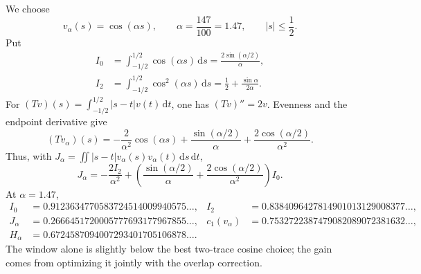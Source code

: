 \documentclass[11pt]{article}
\newcommand{\dd}{\,\mathrm{d}}
\begin{document}
We choose
\begin{equation}
 v_\alpha(s)=\cos(\alpha s),\qquad
 \alpha=\frac{147}{100}=1.47,\qquad |s|\le\frac12.
 \label{eq:window}
\end{equation}
Put
\begin{align}
 I_0&=\int_{-1/2}^{1/2}\cos(\alpha s)\dd s
      =\frac{2\sin(\alpha/2)}{\alpha},\\
 I_2&=\int_{-1/2}^{1/2}\cos^2(\alpha s)\dd s
      =\frac12+\frac{\sin\alpha}{2\alpha}.
 \label{eq:i0i2}
\end{align}
For $(Tv)(s)=\int_{-1/2}^{1/2}|s-t|v(t)\dd t$, one has $(Tv)''=2v$.
Evenness and the endpoint derivative give
\begin{equation}
 (Tv_\alpha)(s)=-\frac{2}{\alpha^2}\cos(\alpha s)
 +\frac{\sin(\alpha/2)}{\alpha}
 +\frac{2\cos(\alpha/2)}{\alpha^2}.
 \label{eq:tv}
\end{equation}
Thus, with $J_\alpha=\iint|s-t|v_\alpha(s)v_\alpha(t)\dd s\dd t$,
\begin{equation}
 J_\alpha=-\frac{2I_2}{\alpha^2}
 +\left(\frac{\sin(\alpha/2)}{\alpha}
 +\frac{2\cos(\alpha/2)}{\alpha^2}\right)I_0.
 \label{eq:jalpha}
\end{equation}
At $\alpha=1.47$,
\begin{align*}
 I_0&=0.9123634770583724514009940575\ldots,&
 I_2&=0.8384096427814901013129008377\ldots,\\
 J_\alpha&=0.2666451720005777693177967855\ldots,&
 c_1(v_\alpha)&=0.7532722387479082089072381632\ldots,\\
 H_\alpha&=0.6724587094007293401705106878\ldots.
\end{align*}
The window alone is slightly below the best two-trace cosine choice; the gain
comes from optimizing it jointly with the overlap correction.
\end{document}

